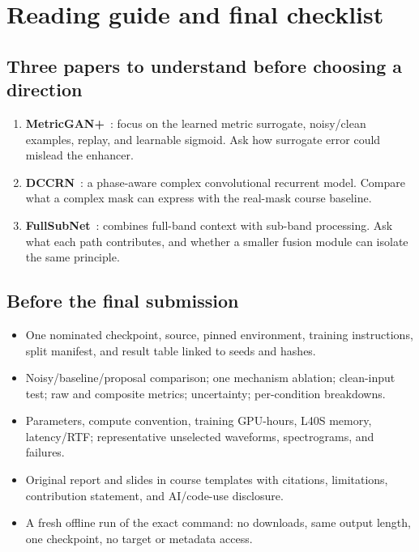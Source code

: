 \documentclass[11pt,letterpaper]{article}
\newcommand{\page}[1]{\clearpage\section{#1}}
\begin{document}
\page{Reading guide and final checklist}
\subsection{Three papers to understand before choosing a direction}
\begin{enumerate}
\item \textbf{MetricGAN+}~\cite{metricgan}: focus on the learned metric surrogate, noisy/clean examples, replay, and learnable sigmoid. Ask how surrogate error could mislead the enhancer.
\item \textbf{DCCRN}~\cite{dccrn}: a phase-aware complex convolutional recurrent model. Compare what a complex mask can express with the real-mask course baseline.
\item \textbf{FullSubNet}~\cite{fullsubnet}: combines full-band context with sub-band processing. Ask what each path contributes, and whether a smaller fusion module can isolate the same principle.
\end{enumerate}

\subsection{Before the final submission}
\begin{itemize}
\item One nominated checkpoint, source, pinned environment, training instructions, split manifest, and result table linked to seeds and hashes.
\item Noisy/baseline/proposal comparison; one mechanism ablation; clean-input test; raw and composite metrics; uncertainty; per-condition breakdowns.
\item Parameters, compute convention, training GPU-hours, L40S memory, latency/RTF; representative unselected waveforms, spectrograms, and failures.
\item Original report and slides in course templates with citations, limitations, contribution statement, and AI/code-use disclosure.
\item A fresh offline run of the exact command: no downloads, same output length, one checkpoint, no target or metadata access.
\end{itemize}
\end{document}
